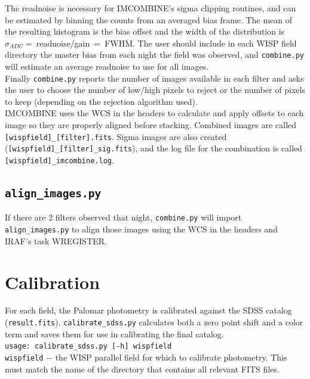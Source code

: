 \documentclass{article}
\begin{document}
\noindent The readnoise is necessary for IMCOMBINE's sigma clipping routines,
and can be estimated by binning the counts from an averaged bias frame. The
mean of the resulting histogram is the bias offset and 
the width of the distribution is $\sigma_{ADU} =~$readnoise/gain$~=~$FWHM.
The user should include in each WISP field directory the master bias from
each night the field was observed, and \texttt{combine.py} will estimate
an average readnoise to use for all images.\\

\noindent Finally \texttt{combine.py} reports the number of images available
in each filter and asks the user to choose the number of low/high pixels
to reject or the number of pixels to keep 
(depending on the rejection algorithm used). \\

\noindent IMCOMBINE uses the WCS in the headers to calculate and apply 
offsets to each image so they are properly aligned before stacking. 
Combined images are called \texttt{[wispfield]\_[filter].fits}. 
Sigma images are also created (\texttt{[wispfield]\_[filter]\_sig.fits}),
and the log file for the combination is called
\texttt{[wispfield]\_imcombine.log}. \\

\subsection{\texttt{align\_images.py}}
If there are 2 filters observed that night, \texttt{combine.py} will 
import \texttt{align\_images.py} to align those images using 
the WCS in the headers and IRAF's 
task WREGISTER.

\vspace{4 mm}
\section{Calibration}
For each field, the Palomar photometry is calibrated against the SDSS catalog 
(\texttt{result.fits}). \texttt{calibrate\_sdss.py} calculates both a zero 
point shift and a color term and saves them for use in calibrating the final 
catalog. \\

\texttt{usage: calibrate\_sdss.py [-h] wispfield} \\

\texttt{wispfield} $-$ \hangindent=2.7cm the WISP parallel field for which
to calibrate photometry. This must match the name of the directory that
contains all relevant FITS files.\\
\end{document}
